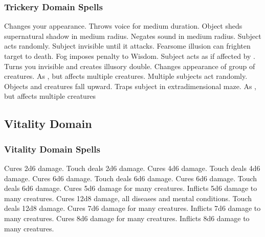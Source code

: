 \subsubsection{Trickery Domain Spells}
\begin{spelllist}
   Changes your appearance.
   Throws voice for medium duration.
   Object sheds supernatural shadow in medium radius.
   Negates sound in medium radius.
   Subject acts randomly.
   Subject invisible until it attacks.
  \spellhead[4]{}
   Fearsome illusion can frighten target to death.
   Fog imposes  penalty to Wisdom.
   Subject acts as if affected by .
   Turns you invisible and creates illusory double.
   Changes appearance of group of creatures.
   As , but affects multiple creatures.
   Multiple subjects act randomly.
  \spellhead[8]{}
   Objects and creatures fall upward.
   Traps subject in extradimensional maze.
   As , but affects multiple creatures
\end{spelllist}

\subsection{Vitality Domain}
\subsubsection{Vitality Domain Spells}
\begin{spelllist}
   Cures 2d6 damage.
   Touch deals 2d6 damage.
   Cures 4d6 damage.
   Touch deals 4d6 damage.
   Cures 6d6 damage.
   Touch deals 6d6 damage.
   Cures 6d6 damage.
   Touch deals 6d6 damage.
   Cures 5d6 damage for many creatures.
   Inflicts 5d6 damage to many creatures.
   Cures 12d8 damage, all diseases and mental conditions.
   Touch deals 12d8 damage.
   Cures 7d6 damage for many creatures.
   Inflicts 7d6 damage to many creatures.
   Cures 8d6 damage for many creatures.
   Inflicts 8d6 damage to many creatures.
  \spellhead[9]{}
  \spellhead[9]{}
\end{spelllist}

